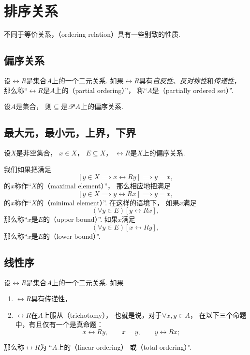 \section{排序关系}
不同于等价关系，（ordering relation）具有一些别致的性质.

\subsection{偏序关系}
\begin{definition}
设\(\rel{R}\)是集合\(A\)上的一个二元关系.
如果\(\rel{R}\)具有\emph{自反性}、\emph{反对称性}和\emph{传递性}，
那么称“\(\rel{R}\)是\(A\)上的（partial ordering）”，
称“\(A\)是（partially ordered set）”.
\end{definition}

\begin{example}
设\(A\)是集合，
则\(\subseteq\)是\(\mathscr{P} A\)上的偏序关系.
\end{example}

\subsection{最大元，最小元，上界，下界}
\begin{definition}
设\(X\)是非空集合，
\(x \in X\)，
\(E \subseteq X\)，
\(\rel{R}\)是\(X\)上的偏序关系.

我们如果把满足\[
	[y \in X \implies x\rel{R}y]
	\implies
	y = x,
\]的\(x\)称作“\(X\)的（maximal element）”，
那么相应地把满足\[
	[y \in X \implies y\rel{R}x]
	\implies
	y = x,
\]的\(x\)称作“\(X\)的（minimal element）”.
在这样的语境下，
如果\(x\)满足\[
	(\forall y \in E)[y\rel{R}x],
\]
那么称“\(x\)是\(E\)的（upper bound）”.
如果\(x\)满足\[
	(\forall y \in E)[x\rel{R}y],
\]
那么称“\(x\)是\(E\)的（lower bound）”.
\end{definition}

\subsection{线性序}
\begin{definition}
设\(\rel{R}\)是集合\(A\)上的一个二元关系.
如果\begin{enumerate}
	\item \(\rel{R}\)具有传递性，
	\item \(\rel{R}\)在\(A\)上服从（trichotomy），
	也就是说，对于\(\forall x,y \in A\)，
	在以下三个命题中，有且仅有一个是真命题：\[
		x \rel{R} y, \qquad
		x = y, \qquad
		y \rel{R} x;
	\]
\end{enumerate}
那么称\(\rel{R}\)为
“\(A\)上的（linear ordering）
或（total ordering）”.
\end{definition}

